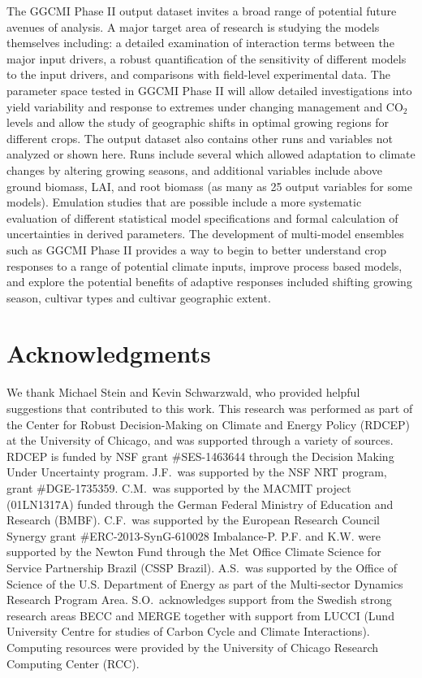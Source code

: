 \documentclass[preprint, 5p, times, twocolumn]{elsarticle}
\begin{document}
{\color{blue}
The GGCMI Phase II output dataset invites a broad range of potential future avenues of analysis. A major target area of research is studying the models themselves including: a detailed examination of interaction terms between the major input drivers, a robust quantification of the sensitivity of different models to the input drivers, and comparisons with field-level experimental data. The parameter space tested in GGCMI Phase II will allow detailed investigations into yield variability and response to extremes under changing management and CO$_2$ levels and allow the study of geographic shifts in optimal growing regions for different crops. The output dataset also contains other runs and variables not analyzed or shown here. Runs include several which allowed adaptation to climate changes by altering growing seasons, and additional variables include above ground biomass, LAI, and root biomass (as many as 25 output variables for some models). Emulation studies that are possible include a more systematic evaluation of different statistical model specifications and formal calculation of uncertainties in derived parameters. The development of multi-model ensembles such as GGCMI Phase II provides a way to begin to better understand crop responses to a range of potential climate inputs, improve process based models, and explore the potential benefits of adaptive responses included shifting growing season, cultivar types and cultivar geographic extent.}



\section{Acknowledgments}
\label{S:7}
We thank Michael Stein and Kevin Schwarzwald, who provided helpful suggestions that contributed to this work. This research was performed as part of the Center for Robust Decision-Making on Climate and Energy Policy (RDCEP) at the University of Chicago, and was supported through a variety of sources. RDCEP is funded by NSF grant \#SES-1463644 through the Decision Making Under Uncertainty program. J.F.\ was supported by the NSF NRT program, grant \#DGE-1735359. C.M.\ was supported by the MACMIT project (01LN1317A) funded through the German Federal Ministry of Education and Research (BMBF).  C.F.\ was supported by the European Research Council Synergy grant \#ERC-2013-SynG-610028 Imbalance-P. P.F. and K.W. were supported  by the Newton Fund through the Met Office Climate Science for Service Partnership Brazil (CSSP Brazil). A.S.\ was supported by the Office of Science of the U.S. Department of Energy as part of the Multi-sector Dynamics Research Program Area. S.O.\ acknowledges support from the Swedish strong research areas BECC and MERGE together with support from LUCCI (Lund University Centre for studies of Carbon Cycle and Climate Interactions). Computing resources were provided by the University of Chicago Research Computing Center (RCC).
\end{document}
